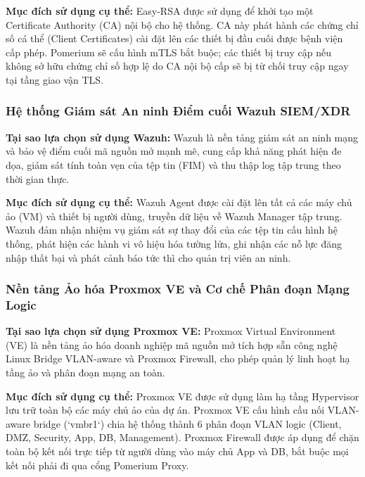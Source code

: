 \textbf{Mục đích sử dụng cụ thể:} Easy-RSA được sử dụng để khởi tạo một Certificate Authority (CA) nội bộ cho hệ thống. CA này phát hành các chứng chỉ số cá thể (Client Certificates) cài đặt lên các thiết bị đầu cuối được bệnh viện cấp phép. Pomerium sẽ cấu hình mTLS bắt buộc; các thiết bị truy cập nếu không sở hữu chứng chỉ số hợp lệ do CA nội bộ cấp sẽ bị từ chối truy cập ngay tại tầng giao vận TLS.

\subsubsection{Hệ thống Giám sát An ninh Điểm cuối Wazuh SIEM/XDR}

\textbf{Tại sao lựa chọn sử dụng Wazuh:} Wazuh là nền tảng giám sát an ninh mạng và bảo vệ điểm cuối mã nguồn mở mạnh mẽ, cung cấp khả năng phát hiện đe dọa, giám sát tính toàn vẹn của tệp tin (FIM) và thu thập log tập trung theo thời gian thực.

\textbf{Mục đích sử dụng cụ thể:} Wazuh Agent được cài đặt lên tất cả các máy chủ ảo (VM) và thiết bị người dùng, truyền dữ liệu về Wazuh Manager tập trung. Wazuh đảm nhận nhiệm vụ giám sát sự thay đổi của các tệp tin cấu hình hệ thống, phát hiện các hành vi vô hiệu hóa tường lửa, ghi nhận các nỗ lực đăng nhập thất bại và phát cảnh báo tức thì cho quản trị viên an ninh.

\subsubsection{Nền tảng Ảo hóa Proxmox VE và Cơ chế Phân đoạn Mạng Logic}

\textbf{Tại sao lựa chọn sử dụng Proxmox VE:} Proxmox Virtual Environment (VE) là nền tảng ảo hóa doanh nghiệp mã nguồn mở tích hợp sẵn công nghệ Linux Bridge VLAN-aware và Proxmox Firewall, cho phép quản lý linh hoạt hạ tầng ảo và phân đoạn mạng an toàn.

\textbf{Mục đích sử dụng cụ thể:} Proxmox VE được sử dụng làm hạ tầng Hypervisor lưu trữ toàn bộ các máy chủ ảo của dự án. Proxmox VE cấu hình cầu nối VLAN-aware bridge (`vmbr1`) chia hệ thống thành 6 phân đoạn VLAN logic (Client, DMZ, Security, App, DB, Management). Proxmox Firewall được áp dụng để chặn toàn bộ kết nối trực tiếp từ người dùng vào máy chủ App và DB, bắt buộc mọi kết nối phải đi qua cổng Pomerium Proxy.
